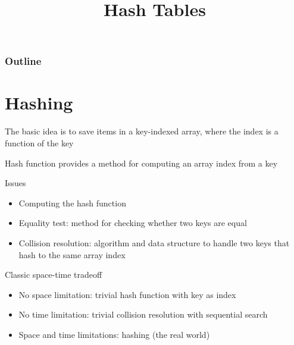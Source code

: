 \documentclass[8pt,a4paper,compress]{beamer}
\title{Hash Tables}
\date{}
\begin{document}
\begin{frame}
\vfill
\titlepage
\end{frame}

\begin{frame}
\frametitle{Outline}
\tableofcontents
\end{frame}

\section{Hashing}
\begin{frame}[fragile]
The basic idea is to save items in a key-indexed array, where the index is a function of the key

\bigskip

Hash function provides a method for computing an array index from a key

\bigskip

Issues
\begin{itemize}
\item Computing the hash function

\item Equality test: method for checking whether two keys are equal

\item Collision resolution: algorithm and data structure to handle two keys that hash to the same array index
\end{itemize}

\bigskip

Classic space-time tradeoff
\begin{itemize}
\item No space limitation: trivial hash function with key as index

\item No time limitation: trivial collision resolution with sequential search

\item Space and time limitations: hashing (the real world)
\end{itemize}
\end{frame}
\end{document}
